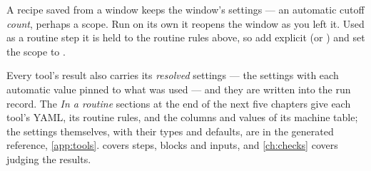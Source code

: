 \begin{caution}
A recipe saved from a window keeps the window's settings — an automatic cutoff \emph{count}, perhaps a  scope. Run on its own it reopens the window as you left it. Used as a routine step it is held to the routine rules above, so add explicit  (or ) and set the scope to .
\end{caution}

Every tool's result also carries its \emph{resolved} settings — the settings with each automatic value pinned to what was used — and they are written into the run record. The \emph{In a routine} sections at the end of the next five chapters give each tool's YAML, its routine rules, and the columns and values of its machine table; the settings themselves, with their types and defaults, are in the generated reference, \cref{app:tools}.  covers steps,  blocks and inputs, and \cref{ch:checks} covers judging the results.

